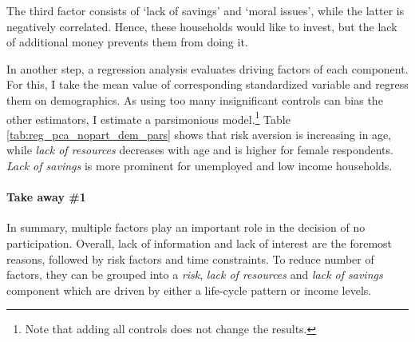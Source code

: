\documentclass[ProjectABM]{subfiles}
\begin{document}
The third factor consists of `lack of savings' and `moral issues', while the latter is negatively correlated. Hence, these households would like to invest, but the lack of additional money prevents them from doing it.




%

In another step, a regression analysis evaluates driving factors of each component. For this, I take the mean value of corresponding standardized variable and regress them on demographics. As using too many insignificant controls can bias the other estimators, I estimate a parsimonious model.\footnote{Note that adding all controls does not change the results.} Table \ref{tab:reg_pca_nopart_dem_pars} shows that risk aversion is increasing in age, while \textit{lack of resources} decreases with age and is higher for female respondents. \textit{Lack of savings} is more prominent for unemployed and low income households.




\paragraph{Take away \#1}
In summary, multiple factors play an important role in the decision of no participation. Overall, lack of information and lack of interest are the foremost reasons, followed by risk factors and time constraints. To reduce number of factors, they can be grouped into a \textit{risk}, \textit{lack of resources} and \textit{lack of savings} component which are driven by either a life-cycle pattern or income levels. %
\end{document}
